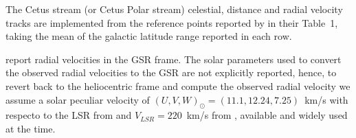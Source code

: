 The Cetus stream (or Cetus Polar stream) celestial, distance and radial velocity tracks are implemented from the 
reference points reported by \citet{Yam2013} in their Table~1, taking the mean of the galactic latitude range reported in each row. 

\citet{Yam2013} report radial velocities in the GSR frame. The solar parameters used to convert the observed radial velocities to the GSR are not explicitly reported, hence, to revert back to the heliocentric frame and compute the observed radial velocity we assume a solar peculiar velocity of $(U,V,W)_\odot=(11.1,12.24,7.25)$~km/s with respecto to the LSR from \citet{Schoenrich2010} and $V_{LSR}=220$~km/s from \citet{DehnenBinney1998}, available and widely used at the time.
